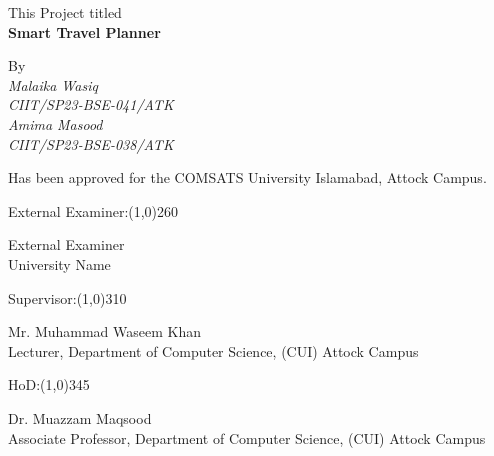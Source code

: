 \documentclass[A4paper,12pt]{report}
\theoremstyle{plain}
\theoremstyle{definition}
\theoremstyle{remark}
\numberwithin{equation}{section}
\begin{document}
\begin{center}
\normalsize {This Project titled}\\
\vspace{0.05in}
\LARGE{\textbf{Smart Travel Planner}}\\
\vspace{0.4in}

\normalsize{By}\\
\vspace{0.3in}
\large{\textit{Malaika Wasiq}\\
{\textit{CIIT/SP23-BSE-041/ATK}}}\\[0.15in]
\large{\textit{Amima Masood}\\
{\textit{CIIT/SP23-BSE-038/ATK}}}\\
\vspace{0.4in}

\normalsize{Has been approved for the COMSATS University Islamabad, Attock Campus.}\\
\end{center}

\vspace{0.1in}
\noindent External Examiner:\line(1,0){260}
\begin{center}
\normalsize{External Examiner \\
University Name}\\
\end{center}
\vspace{0.1in}
Supervisor:\line(1,0){310}
\begin{center}
\normalsize{Mr. Muhammad Waseem Khan\\
Lecturer, Department of Computer Science, (CUI) Attock Campus}
\end{center}
\vspace{0.1in}
HoD:\line(1,0){345}
\begin{center}
\normalsize{Dr. Muazzam Maqsood\\
Associate Professor, Department of Computer Science, (CUI) Attock Campus}
\end{center}
\end{document}
